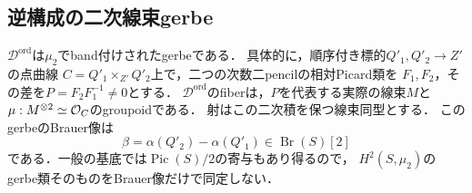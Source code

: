 \subsection{逆構成の二次線束gerbe}

\begin{proposition}
\label{prop:qa-spectral-relative-quadratic-gerbe}
$\mathscr D^{\mathrm{ord}}$は$\mu_2$でband付けされたgerbeである．
具体的に，順序付き標的$Q'_1,Q'_2\to Z'$の点曲線
$C=Q'_1\times_{Z'}Q'_2$上で，二つの次数二pencilの相対Picard類を
$F_1,F_2$，その差を$P=F_2F_1^{-1}\ne0$とする．
$\mathscr D^{\mathrm{ord}}$のfiberは，$P$を代表する実際の線束$M$と
$\mu:M^{\otimes2}\simeq\mathcal O_C$のgroupoidである．
射はこの二次積を保つ線束同型とする．
このgerbeのBrauer像は
\[
 \beta=\alpha(Q'_2)-\alpha(Q'_1)\in\operatorname{Br}(S)[2]
\]
である．一般の基底では$\operatorname{Pic}(S)/2$の寄与もあり得るので，
$H^2(S,\mu_2)$のgerbe類そのものをBrauer像だけで同定しない．
\end{proposition}
